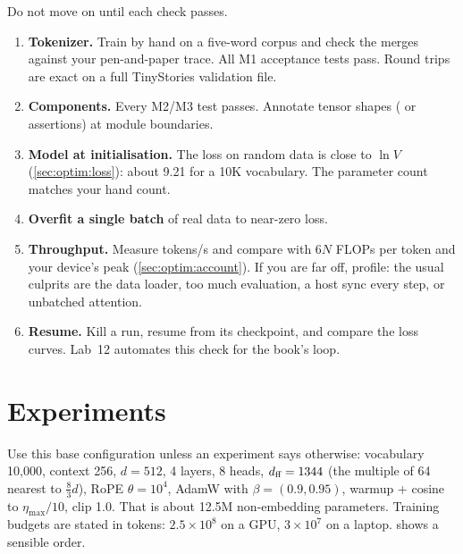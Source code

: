 Do not move on until each check passes.

\begin{enumerate}
  \item \textbf{Tokenizer.} Train by hand on a five-word corpus and check the merges against your
        pen-and-paper trace. All M1 acceptance tests pass. Round trips are exact on a full
        TinyStories validation file.
  \item \textbf{Components.} Every M2/M3 test passes. Annotate tensor shapes
        ( or assertions) at module boundaries.
  \item \textbf{Model at initialisation.} The loss on random data is close to $\ln V$
        (\cref{sec:optim:loss}): about 9.21 for a 10K vocabulary. The parameter count matches your
        hand count.
  \item \textbf{Overfit a single batch} of real data to near-zero loss.
  \item \textbf{Throughput.} Measure tokens/s and compare with $6N$ FLOPs per token and your
        device's peak (\cref{sec:optim:account}). If you are far off, profile: the usual culprits
        are the data loader, too much evaluation, a host sync every step, or unbatched attention.
  \item \textbf{Resume.} Kill a run, resume from its checkpoint, and compare the loss curves.
        Lab~12 automates this check for the book's loop.
\end{enumerate}

\section{Experiments}\label{sec:proj1:experiments}

Use this base configuration unless an experiment says otherwise: vocabulary 10,000, context 256,
$d=512$, 4 layers, 8 heads, $d_{\text{ff}}=1344$ (the multiple of 64 nearest to $\tfrac83 d$), RoPE
$\theta=10^4$, AdamW with $\beta=(0.9,0.95)$, warmup + cosine to $\eta_{\max}/10$, clip 1.0. That
is about 12.5M non-embedding parameters. Training budgets are stated in tokens: $2.5\times10^8$
on a GPU, $3\times10^7$ on a laptop.  shows a sensible order.

